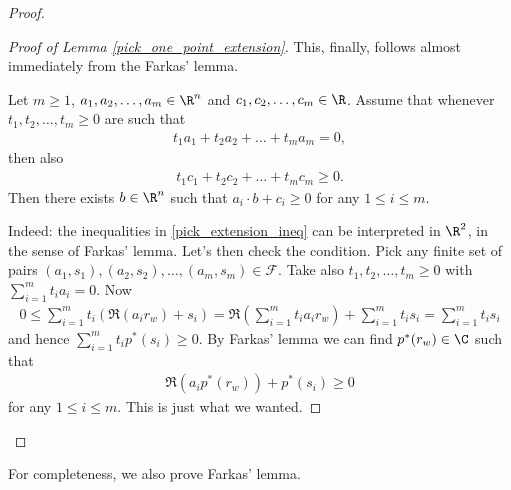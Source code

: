 \begin{proof}
\begin{proof}[Proof of Lemma \ref{pick_one_point_extension}]
		This, finally, follows almost immediately from the Farkas' lemma.
		\begin{lem}\label{farkas_lemma}
			Let $m \geq 1$, $a_{1}, a_{2}, \ldots, a_{m} \in \R^{n}$ and $c_{1}, c_{2}, \ldots, c_{m} \in \R$. Assume that whenever $t_{1}, t_{2}, \ldots, t_{m} \geq 0$ are such that
			\begin{align*}
				t_{1} a_{1} + t_{2} a_{2} + \ldots + t_{m} a_{m} = 0,
			\end{align*}
			then also
			\begin{align*}
				t_{1} c_{1} + t_{2} c_{2} + \ldots + t_{m} c_{m} \geq 0.
			\end{align*}
			Then there exists $b \in \R^{n}$ such that $a_{i} \cdot b + c_{i} \geq 0$ for any $1 \leq i \leq m$.
		\end{lem}
		Indeed: the inequalities in \ref{pick_extension_ineq} can be interpreted in $\R^{2}$, in the sense of Farkas' lemma. Let's then check the condition. Pick any finite set of pairs $(a_{1}, s_{1}), (a_{2}, s_{2}), \ldots, (a_{m}, s_{m}) \in \mathcal{F}$. Take also $t_{1}, t_{2}, \ldots, t_{m} \geq 0$ with $\sum_{i = 1}^{m} t_{i} a_{i} = 0$. Now
		\begin{align*}
			0 \leq \sum_{i = 1}^{m} t_{i} \left(\Re(a_{i} r_{w}) + s_{i}\right) = \Re\left(\sum_{i = 1}^{m} t_{i} a_{i} r_{w}\right) + \sum_{i = 1}^{m} t_{i} s_{i} = \sum_{i = 1}^{m} t_{i} s_{i}
		\end{align*}
		and hence $\sum_{i = 1}^{m} t_{i} p^{*}(s_{i}) \geq 0$. By Farkas' lemma we can find $p^{*}(r_{w}) \in \C$ such that
		\begin{align*}
			\Re(a_{i} p^{*}(r_{w})) + p^{*}(s_{i}) \geq 0
		\end{align*}
		for any $1 \leq i \leq m$. This is just what we wanted.
	\end{proof}
\end{proof}

For completeness, we also prove Farkas' lemma.

